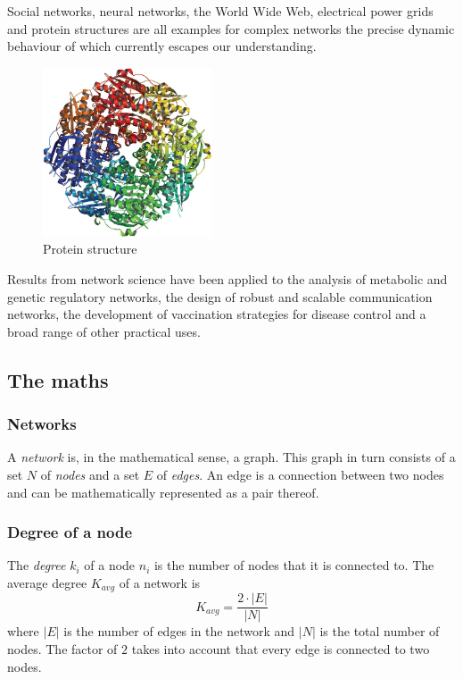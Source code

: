 \documentclass[a4paper,11pt,titlepage]{article}
\begin{document}
Social networks, neural networks, the World Wide Web, electrical power grids and
protein structures are all examples for complex networks the precise dynamic
behaviour of which currently escapes our understanding.

\begin{figure}[ht!]
  \centering
  \includegraphics[height=50mm,width=50mm]{protein-structure.png}
  \caption{Protein structure}
  \label{fig:protein}
\end{figure}


Results from network science have been applied to the analysis of metabolic and
genetic regulatory networks, the design of robust and scalable communication
networks, the development of vaccination strategies
for disease control and a broad range of other practical
uses. \cite{complexNets}


\subsection{The maths}


\subsubsection{Networks}

A \emph{network} is, in the mathematical sense, a graph. This
graph in turn consists of a set $N$ of \emph{nodes} and a set
$E$ of \emph{edges}. An edge is a connection between two nodes
and can be mathematically represented as a pair thereof.


\subsubsection{Degree of a node}

The \emph{degree} $k_i$ of a node $n_i$ is the number of nodes that it is
connected to. The average degree $K_{avg}$ of a network is
\[ K_{avg} =\frac{2 \cdot |E|}{|N|} \]
where $|E|$ is the number of edges in the network and $|N|$ is the total
number of nodes. The factor of $2$ takes into account that every edge is
connected to two nodes.
\end{document}
